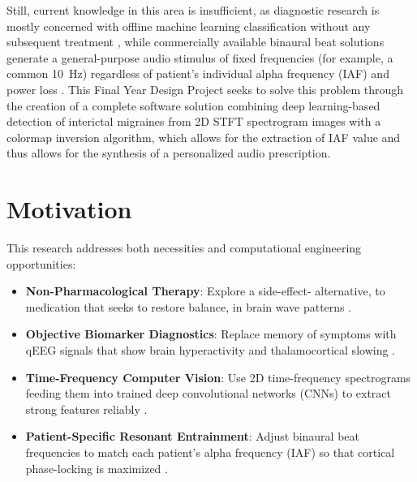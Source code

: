 \documentclass[12pt, a4paper]{report}
\begin{document}
Still, current knowledge in this area is insufficient, as diagnostic research is mostly concerned with offline machine learning classification without any subsequent treatment \cite{aslan2023migrainecnn,orhanbulucu2023hybrid}, while commercially available binaural beat solutions generate a general-purpose audio stimulus of fixed frequencies (for example, a common 10~Hz) regardless of patient's individual alpha frequency (IAF) and power loss \cite{CoronaGonzalez2021,KahathuduwaBlume2025}. This Final Year Design Project seeks to solve this problem through the creation of a complete software solution combining deep learning-based detection of interictal migraines from 2D STFT spectrogram images with a colormap inversion algorithm, which allows for the extraction of IAF value and thus allows for the synthesis of a personalized audio prescription.

\section{Motivation}
\label{sec:motivation_objectives}
This research addresses both necessities and computational engineering opportunities:

\begin{itemize}

    \item \textbf{Non-Pharmacological Therapy}: Explore a side-effect- alternative, to medication that seeks to restore balance, in brain wave patterns \cite{Quartetti2025,Shamsi2024}.

    \item \textbf{Objective Biomarker Diagnostics}: Replace memory of symptoms with qEEG signals that show brain hyperactivity and thalamocortical slowing \cite{chamanzar2021uhd,Petrusic2025}.

    \item \textbf{Time-Frequency Computer Vision}: Use 2D time-frequency spectrograms feeding them into trained deep convolutional networks (CNNs) to extract strong features reliably \cite{orhanbulucu2023hybrid,Rakhmatulin2024}.

    \item \textbf{Patient-Specific Resonant Entrainment}: Adjust binaural beat frequencies to match each patient’s alpha frequency (IAF) so that cortical phase-locking is maximized \cite{Melnichuk2025,Hamid2025}.

\end{itemize}
\end{document}

